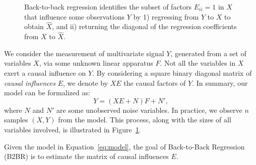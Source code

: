 \documentclass{article}
\begin{document}
\begin{figure}[t!]
    \caption{Back-to-back regression identifies the subset of factors $E_{ii} = 1$ in $X$ that influence some observations $Y$ by 1) regressing from $Y$ to $X$ to obtain $\hat{X}$, and ii) returning the diagonal of the regression coefficients from $X$ to $\hat{X}$.}
    \label{fig:b2b}
\end{figure}

We consider the measurement of multivariate signal $Y$, generated from a set of variables $X$, via some unknown linear apparatus $F$.
%
Not all the variables in $X$ exert a causal influence on $Y$.
%
By considering a square binary diagonal matrix of \emph{causal influences} $E$, we denote by $XE$ the causal factors of $Y$.
%
In summary, our model can be formalized as:
%
\begin{equation}
    Y = (XE + N)F + N',\label{eq:model}
\end{equation}
%
where $N$ and $N'$ are some unobserved noise variables.
%
In practice, we observe $n$ samples $(X, Y)$ from the model.
%
This process, along with the sizes of all variables involved, is illustrated in Figure~\ref{fig:b2b}.

Given the model in Equation~\eqref{eq:model}, the goal of Back-to-Back Regression (B2BR) is to estimate the matrix of causal influences $E$.
\end{document}
